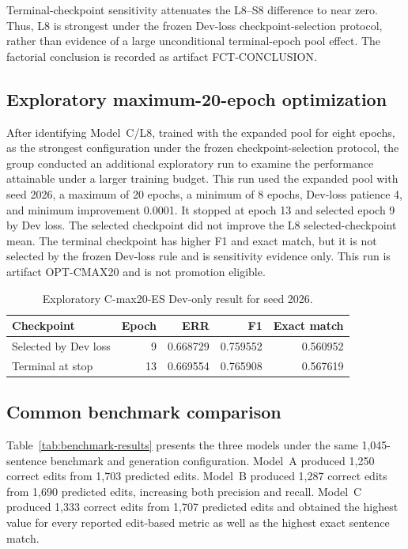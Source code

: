 \documentclass[11pt]{article}
\begin{document}
Terminal-checkpoint sensitivity attenuates the L8--S8 difference to near zero. Thus, L8 is strongest under the frozen Dev-loss checkpoint-selection protocol, rather than evidence of a large unconditional terminal-epoch pool effect. The factorial conclusion is recorded as artifact FCT-CONCLUSION.

\subsection{Exploratory maximum-20-epoch optimization}

After identifying Model~C/L8, trained with the expanded pool for eight epochs, as the strongest configuration under the frozen checkpoint-selection protocol, the group conducted an additional exploratory run to examine the performance attainable under a larger training budget. This run used the expanded pool with seed 2026, a maximum of 20 epochs, a minimum of 8 epochs, Dev-loss patience 4, and minimum improvement 0.0001. It stopped at epoch 13 and selected epoch 9 by Dev loss. The selected checkpoint did not improve the L8 selected-checkpoint mean. The terminal checkpoint has higher F1 and exact match, but it is not selected by the frozen Dev-loss rule and is sensitivity evidence only. This run is artifact OPT-CMAX20 and is not promotion eligible.

\begin{table}[t]
\centering
\caption{Exploratory C-max20-ES Dev-only result for seed 2026.}
\label{tab:cmax20-results}
\begin{tabular}{lrrrr}
\toprule
Checkpoint & Epoch & ERR & F1 & Exact match \\
\midrule
Selected by Dev loss & 9 & 0.668729 & 0.759552 & 0.560952 \\
Terminal at stop & 13 & 0.669554 & 0.765908 & 0.567619 \\
\bottomrule
\end{tabular}
\end{table}

\subsection{Common benchmark comparison}

Table~\ref{tab:benchmark-results} presents the three models under the same 1,045-sentence benchmark and generation configuration. Model~A produced 1,250 correct edits from 1,703 predicted edits. Model~B produced 1,287 correct edits from 1,690 predicted edits, increasing both precision and recall. Model~C produced 1,333 correct edits from 1,707 predicted edits and obtained the highest value for every reported edit-based metric as well as the highest exact sentence match.
\end{document}
